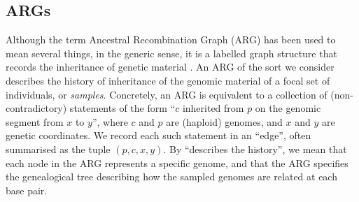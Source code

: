 \documentclass{article}
\begin{document}
\subsection*{ARGs} \label{par:recording}
Although the term Ancestral Recombination Graph (ARG) has been used to mean several things,
in the generic sense, it is a labelled graph structure that records
the inheritance of genetic material \citep{wong_general_2023}.
An ARG of the sort we consider describes the history of inheritance
of the genomic material of a focal set of individuals, or \emph{samples}.
Concretely, an ARG is equivalent to a collection of (non-contradictory) statements
of the form ``$c$ inherited from $p$ on the genomic segment from $x$ to $y$'',
where $c$ and $p$ are (haploid) genomes, and $x$ and $y$ are genetic coordinates.
We record each such statement in an ``edge'',
often summarised as the tuple $(p,c,x,y)$.
By ``describes the history'',
we mean that each node in the ARG represents a specific genome, 
and that the ARG specifies the genealogical tree describing how the
sampled genomes are related
at each base pair. 
\end{document}

